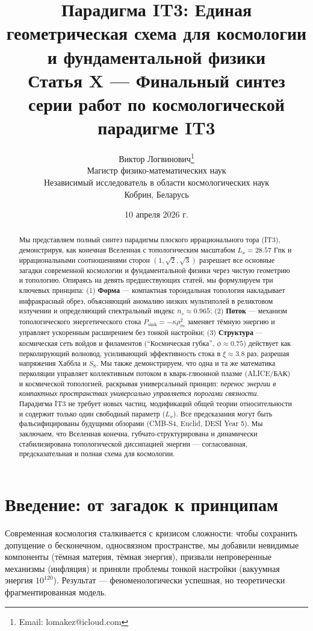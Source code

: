 \documentclass[12pt,a4paper]{article}
\title{\textbf{Парадигма IT3: Единая геометрическая схема для космологии и фундаментальной физики}\\[0.5cm]
\large Статья X — Финальный синтез серии работ по космологической парадигме IT3}
\author{Виктор Логвинович\thanks{Email: lomakez@icloud.com}\\
Магистр физико-математических наук\\
Независимый исследователь в области космологических наук\\
Кобрин, Беларусь}
\date{10 апреля 2026 г.}
\begin{document}
\maketitle

\begin{abstract}
Мы представляем полный синтез парадигмы плоского иррационального тора (IT3), демонстрируя, как конечная Вселенная с топологическим масштабом $L_x = 28.57$ Гпк и иррациональными соотношениями сторон $(1, \sqrt{2}, \sqrt{3})$ разрешает все основные загадки современной космологии и фундаментальной физики через чистую геометрию и топологию. Опираясь на девять предшествующих статей, мы формулируем три ключевых принципа: (1) \textbf{Форма} — компактная тороидальная топология накладывает инфракрасный обрез, объясняющий аномалию низких мультиполей в реликтовом излучении и определяющий спектральный индекс $n_s \approx 0.965$; (2) \textbf{Поток} — механизм топологического энергетического стока $P_{\mathrm{sink}} = -\kappa \rho_m^2$ заменяет тёмную энергию и управляет ускоренным расширением без тонкой настройки; (3) \textbf{Структура} — космическая сеть войдов и филаментов (``Космическая губка'', $\phi \approx 0.75$) действует как перколирующий волновод, усиливающий эффективность стока в $\xi \approx 3.8$ раз, разрешая напряжения Хаббла и $S_8$. Мы также демонстрируем, что одна и та же математика перколяции управляет коллективным потоком в кварк-глюонной плазме (ALICE/БАК) и космической топологией, раскрывая универсальный принцип: \textit{перенос энергии в компактных пространствах универсально управляется порогами связности}. Парадигма IT3 не требует новых частиц, модификаций общей теории относительности и содержит только один свободный параметр ($L_x$). Все предсказания могут быть фальсифицированы будущими обзорами (CMB-S4, Euclid, DESI Year 5). Мы заключаем, что Вселенная конечна, губчато-структурирована и динамически стабилизирована топологической диссипацией энергии — согласованная, предсказательная и полная схема для космологии.
\end{abstract}

\section{Введение: от загадок к принципам}

Современная космология сталкивается с кризисом сложности: чтобы сохранить допущение о бесконечном, односвязном пространстве, мы добавили невидимые компоненты (тёмная материя, тёмная энергия), призвали непроверенные механизмы (инфляция) и приняли проблемы тонкой настройки (вакуумная энергия $10^{120}$). Результат — феноменологически успешная, но теоретически фрагментированная модель.
\end{document}
